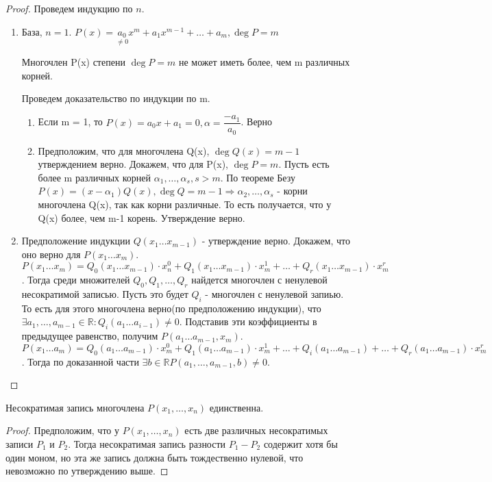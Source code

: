 \begin{proof}
	Проведем индукцию по $n$.
	\begin{enumerate}
		\item  База, $n = 1$. \(P(x) = \underset{\ne0}{a_0}x^m+a_1x^{m-1}+\ldots+a_m, \deg P =m\)
		\begin{proposition}
			Многочлен P(x) степени \(\deg P = m\) не может иметь более, чем m различных корней.
		\end{proposition}
		Проведем доказательство по индукции по m.
		\begin{enumerate}
			\item Если m = 1, то \(P(x) = a_0x+a_1 = 0, \alpha = \dfrac{-a_1}{a_0}\). Верно
			\item Предположим, что для многочлена Q(x), \(\deg Q(x) = m - 1\) утверждением верно. Докажем, что для P(x), \(\deg P = m\). Пусть есть более m различных корней \(\alpha_1, \ldots, \alpha_s, s>m\). По теореме Безу \(P(x) = (x-\alpha_1)Q(x), \deg Q = m-1\Longrightarrow \alpha_2,\ldots, \alpha_s\) - корни многочлена Q(x), так как корни различные. То есть получается, что у Q(x) более, чем m-1 корень. Утверждение верно.
		\end{enumerate}
		\item Предположение индукции \(Q(x_1\ldots x_{m-1})\) - утверждение верно. Докажем, что оно верно для \(P(x_1\ldots x_m)\). \(P(x_1\ldots x_m) = Q_0(x_1\ldots x_{m-1})\cdot x_n^0 + Q_1(x_1\ldots x_{m-1})\cdot x_m^1+\ldots+Q_r(x_1\ldots x_{m-1})\cdot x_m^r\). Тогда среди множителей \(Q_0, Q_1, \ldots, Q_r\) найдется многочлен с ненулевой несократимой записью. Пусть это будет \(Q_i\) - многочлен с ненулевой запиью. То есть для этого многочлена верно(по предположению индукции), что \(\exists a_1,\ldots, a_{m-1}\in \mathbb{R}: Q_i(a_1\ldots a_{i-1})\ne0\). Подставив эти коэффициенты в предыдущее равенство, получим \(P(a_1\ldots a_{m-1}, x_m)\). \(P(x_1\ldots a_m) = Q_0(a_1\ldots a_{m-1})\cdot x_m^0 + Q_1(a_1\ldots a_{m-1})\cdot x_m^1+\ldots+Q_i(a_1\ldots a_{m-1})+\ldots+Q_r(a_1\ldots a_{m-1})\cdot x_m^r\). Тогда по доказанной части \(\exists b\in\mathbb{R} P(a_1,\ldots,a_{m-1}, b)\ne 0\).
	\end{enumerate}
\end{proof}

\begin{corollary}
	Несократимая запись многочлена $P(x_1, \dotsc, x_n)$ единственна.
\end{corollary}

\begin{proof}
	Предположим, что у $P(x_1,\dots, x_n)$ есть две различных несократимых записи $P_1$ и $P_2$. Тогда несократимая запись разности $P_1 - P_2$ содержит хотя бы один моном, но эта же запись должна быть тождественно нулевой, что невозможно по утверждению выше.
\end{proof}
